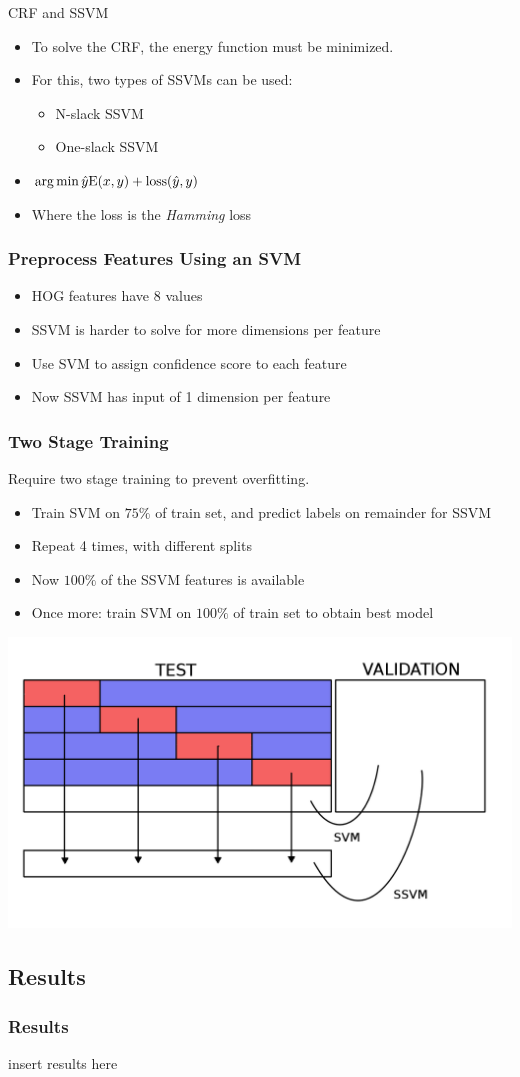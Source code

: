 \begin{frame}{CRF and SSVM}

\begin{itemize}
\item To solve the CRF, the energy function must be minimized.
\item For this, two types of SSVMs can be used:
\begin{itemize}
	\item N-slack SSVM
	\item One-slack SSVM
\end{itemize}
\item $\operatorname*{arg\,min} \hat{y} \text{E}(x, y) + \text{loss}(\hat{y}, y) $
\item Where the loss is the \emph{Hamming} loss
\end{itemize}
\end{frame}

\begin{frame}
\frametitle{Preprocess Features Using an SVM}
\begin{itemize}
\item HOG features have 8 values
\item SSVM is harder to solve for more dimensions per feature
\item Use SVM to assign confidence score to each feature
\item Now SSVM has input of 1 dimension per feature
\end{itemize}
\end{frame}

\begin{frame}
\frametitle{Two Stage Training}
Require two stage training to prevent overfitting.
\begin{itemize}
\item Train SVM on $75\%$ of train set, and predict labels on remainder for SSVM
\item Repeat 4 times, with different splits
\item Now $100\%$ of the SSVM features is available
\item Once more: train SVM on $100\%$ of train set to obtain best model
\end{itemize}
\begin{center}
\includegraphics[width=.5\paperwidth]{resources/twostage}
\end{center}
\end{frame}

\subsection{Results}

\begin{frame}
\frametitle{Results}
insert results here
\end{frame}
